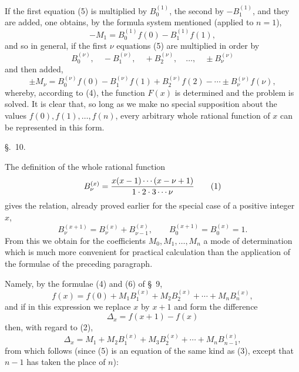 
If the first equation (5) is multiplied by $B_0^{(1)}$, the second by $-B_1^{(1)}$, and they are added, one obtains, by the formula system mentioned (applied to $n=1$),
\[
 -M_1=B_0^{(1)}f(0)-B_1^{(1)}f(1),
\]
and so in general, if the first $\nu$ equations (5) are multiplied in order by
\[
 B_0^{(\nu)},\quad -B_1^{(\nu)},\quad +B_2^{(\nu)},\quad \ldots,\quad \pm B_\nu^{(\nu)}
\]
and then added,
\begin{equation}
 \pm M_\nu=B_0^{(\nu)}f(0)-B_1^{(\nu)}f(1)+B_2^{(\nu)}f(2)-\cdots\pm B_\nu^{(\nu)}f(\nu),
\tag{7}
\end{equation}
whereby, according to (4), the function $F(x)$ is determined and the problem is solved. It is clear that, so long as we make no special supposition about the values $f(0),f(1),\ldots,f(n)$, every arbitrary whole rational function of $x$ can be represented in this form.

\begin{center}
{\large \S.\ 10.}

\vspace{0.5em}
{\large{}}
\end{center}

The definition of the whole rational function
\begin{equation}
 B_\nu^{(x)}={x(x-1)\cdots(x-\nu+1)\over 1\cdot2\cdot3\cdots\nu}
\tag{1}
\end{equation}
gives the relation, already proved earlier for the special case of a positive integer $x$,
\begin{equation}
 B_\nu^{(x+1)}=B_\nu^{(x)}+B_{\nu-1}^{(x)},\qquad B_0^{(x+1)}=B_0^{(x)}=1.
\tag{2}
\end{equation}
From this we obtain for the coefficients $M_0,M_1,\ldots,M_n$ a mode of determination which is much more convenient for practical calculation than the application of the formulae of the preceding paragraph.

Namely, by the formulae (4) and (6) of \S~9,
\begin{equation}
 f(x)=f(0)+M_1B_1^{(x)}+M_2B_2^{(x)}+\cdots+M_nB_n^{(x)},
\tag{3}
\end{equation}
and if in this expression we replace $x$ by $x+1$ and form the difference
\begin{equation}
 \Delta_x=f(x+1)-f(x)
\tag{4}
\end{equation}
then, with regard to (2),
\begin{equation}
 \Delta_x=M_1+M_2B_1^{(x)}+M_3B_2^{(x)}+\cdots+M_nB_{n-1}^{(x)},
\tag{5}
\end{equation}
from which follows (since (5) is an equation of the same kind as (3), except that $n-1$ has taken the place of $n$):
